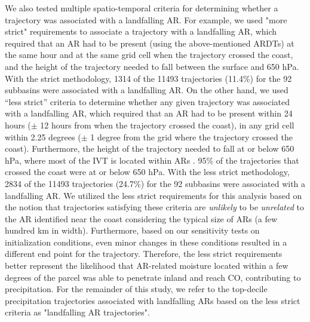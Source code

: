 \documentclass[draft]{agujournal2019}
\begin{document}

We also tested multiple spatio-temporal criteria for determining whether a trajectory was associated with a landfalling AR. For example, we used "more strict" requirements to associate a trajectory with a landfalling AR, which required that an AR had to be present (using the above-mentioned ARDTs) at the same hour and at the same grid cell when the trajectory crossed the coast, and the height of the trajectory needed to fall between the surface and 650 hPa. With the strict methodology, 1314 of the 11493 trajectories (11.4\%) for the 92 subbasins were associated with a landfalling AR. On the other hand, we used “less strict” criteria to determine whether any given trajectory was associated with a landfalling AR, which required that an AR had to be present within 24 hours ($\pm$ 12 hours from when the trajectory crossed the coast), in any grid cell within 2.25 degrees ($\pm$ 1 degree from the grid where the trajectory crossed the coast). Furthermore, the height of the trajectory needed to fall at or below 650 hPa, where most of the IVT is located within ARs \cite{Guan2015}. 95\% of the trajectories that crossed the coast were at or below 650 hPa. With the less strict methodology, 2834 of the 11493 trajectories (24.7\%) for the 92 subbasins were associated with a landfalling AR. We utilized the less strict requirements for this analysis based on the notion that trajectories satisfying these criteria are \textit{unlikely} to be \textit{unrelated} to the AR identified near the coast considering the typical size of ARs (a few hundred km in width). Furthermore, based on our sensitivity tests on initialization conditions, even minor changes in these conditions resulted in a different end point for the trajectory. Therefore, the less strict requirements better represent the likelihood that AR-related moisture located within a few degrees of the parcel was able to penetrate inland and reach CO, contributing to precipitation. For the remainder of this study, we refer to the top-decile precipitation trajectories associated with landfalling ARs based on the less strict criteria as "landfalling AR trajectories". 
\end{document}
